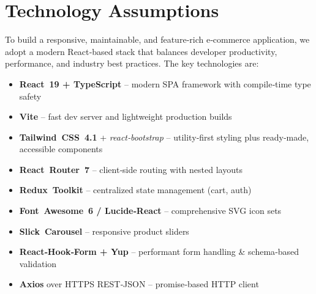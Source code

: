 \documentclass[a4paper,12pt]{article}
\begin{document}
\section{Technology Assumptions}

To build a responsive, maintainable, and feature‑rich e‑commerce
application, we adopt a modern React‑based stack that balances developer
productivity, performance, and industry best practices.  
The key technologies are:

\begin{itemize}
	\item \textbf{React 19 + TypeScript} – modern SPA framework with compile‑time type safety
	\item \textbf{Vite} – fast dev server and lightweight production builds
	\item \textbf{Tailwind CSS 4.1} + \textit{react‑bootstrap} – utility‑first styling plus ready‑made, accessible components
	\item \textbf{React Router 7} – client‑side routing with nested layouts
	\item \textbf{Redux Toolkit} – centralized state management (cart, auth)
	\item \textbf{Font Awesome 6 / Lucide‑React} – comprehensive SVG icon sets
	\item \textbf{Slick Carousel} – responsive product sliders
	\item \textbf{React‑Hook‑Form + Yup} – performant form handling \& schema‑based validation
	\item \textbf{Axios} over HTTPS REST‑JSON – promise‑based HTTP client
\end{itemize}
\end{document}
